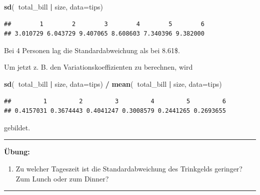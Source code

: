 \documentclass[12pt,ngerman,paper=a4,pagesize,DIV=13]{scrreprt}
\newenvironment{Shaded}{\begin{snugshade}}{\end{snugshade}}
\newcommand{\DataTypeTok}[1]{\textcolor[rgb]{0.13,0.29,0.53}{#1}}
\newcommand{\KeywordTok}[1]{\textcolor[rgb]{0.13,0.29,0.53}{\textbf{#1}}}
\newcommand{\NormalTok}[1]{#1}
\newcommand{\OperatorTok}[1]{\textcolor[rgb]{0.81,0.36,0.00}{\textbf{#1}}}
\newcommand{\StringTok}[1]{\textcolor[rgb]{0.31,0.60,0.02}{#1}}
\providecommand{\tightlist}{%
  \setlength{\itemsep}{0pt}\setlength{\parskip}{0pt}}
\begin{document}
\begin{Shaded}
\begin{Highlighting}[]
\KeywordTok{sd}\NormalTok{(}\OperatorTok{~}\NormalTok{total_bill }\OperatorTok{|}\StringTok{ }\NormalTok{size, }\DataTypeTok{data=}\NormalTok{tips)}
\end{Highlighting}
\end{Shaded}

\begin{verbatim}
##        1        2        3        4        5        6 
## 3.010729 6.043729 9.407065 8.608603 7.340396 9.382000
\end{verbatim}

Bei 4 Personen lag die Standardabweichung als bei 8.61\$.

Um jetzt z. B. den Variationskoeffizienten zu berechnen, wird

\begin{Shaded}
\begin{Highlighting}[]
\KeywordTok{sd}\NormalTok{(}\OperatorTok{~}\NormalTok{total_bill }\OperatorTok{|}\StringTok{ }\NormalTok{size, }\DataTypeTok{data=}\NormalTok{tips) }\OperatorTok{/}\StringTok{ }\KeywordTok{mean}\NormalTok{(}\OperatorTok{~}\NormalTok{total_bill }\OperatorTok{|}\StringTok{ }\NormalTok{size, }\DataTypeTok{data=}\NormalTok{tips)}
\end{Highlighting}
\end{Shaded}

\begin{verbatim}
##         1         2         3         4         5         6 
## 0.4157031 0.3674443 0.4041247 0.3008579 0.2441265 0.2693655
\end{verbatim}

gebildet.

\begin{center}\rule{0.5\linewidth}{\linethickness}\end{center}

\textbf{Übung:}

\begin{enumerate}
\def\labelenumi{\arabic{enumi}.}
\setcounter{enumi}{7}
\tightlist
\item
  Zu welcher Tageszeit ist die Standardabweichung des Trinkgelds
  geringer? Zum Lunch oder zum Dinner?
\end{enumerate}

\begin{center}\rule{0.5\linewidth}{\linethickness}\end{center}
\end{document}
